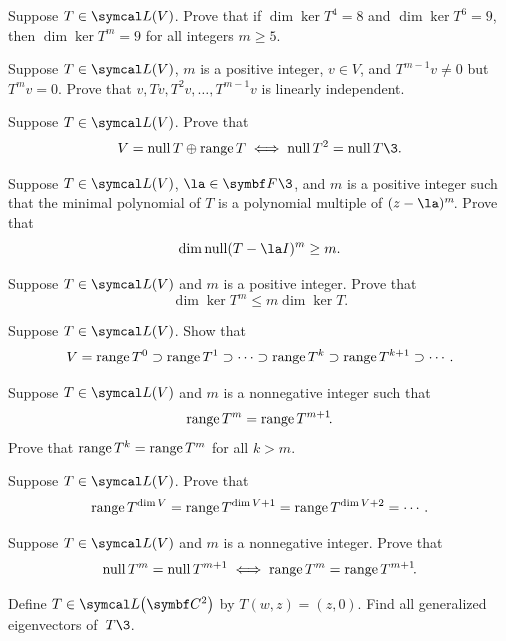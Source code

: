 \begin{exercises}

\exercise
Suppose $T \in \L(V)$. Prove that if $\dim \ker T^4 = 8$ and $\dim \ker T^6 = 9$, then $\dim \ker T^m = 9$ for all integers $m \ge 5$.


\exercise
Suppose $T \in \L(V)$, $m$ is a positive integer, $v \in V$, and $T^{m-1} v \ne 0$ but $T^m v = 0$. Prove that
$
v, Tv, T^2 v, \dots, T^{m-1} v
$
is linearly independent.\label{8linind}


\exercise
Suppose $T \in \L(V)$. Prove that
\[
V = \ker T \oplus \ran T \iff \ker T^2 = \ker T\3.
\]
\exercisedisplayend


\exercise
Suppose $T \in \L(V)$, $\la \in \F{}\3$, and $m$ is a positive integer such that the minimal polynomial of $T$ is a polynomial multiple of
$(z - \la)^m\!$. Prove that
\[
\dim \ker(T - \la I)^m \ge m.
\]
\exercisedisplayend


\exercise
Suppose $T \in \L(V)$ and $m$ is a positive integer. Prove that
\[
\dim \ker T^m \le m \dim \ker T.
\]
\exercisedisplayend
{}


\exercise
Suppose $T \in \L(V)$. Show that \label{range1}
\[
V = \operatorname{range} T^0 \supset \operatorname{range} T^1 \supset \cdots
\supset \operatorname{range} T^k \supset \operatorname{range} T^{k+1} \supset \dotsb .
\]
\exercisedisplayend


\exercise
Suppose $T \in \L(V)$ and $m$ is a nonnegative integer such that \label{range2}
\[
\operatorname{range} T^m = \operatorname{range} T^{m+1}\!.
\]
Prove that $\operatorname{range} T^k = \operatorname{range} T^m$ for all $k > m$.


\exercise
Suppose $T \in \L(V)$. Prove that\label{range3}
\[
\operatorname{range} T^{\dim V} = \operatorname{range} T^{\dim V + 1} = \operatorname{range} T^{\dim V + 2} = \dotsb .
\]
\exercisedisplayend


\exercise
Suppose $T \in \L(V)$ and $m$ is a nonnegative integer. Prove that\label{kerran}
\[
\operatorname{null} T^m = \operatorname{null} T^{m+1} \iff \operatorname{range} T^m = \operatorname{range} T^{m+1}\!.
\]
\exercisedisplayend

\exercise
Define $T \in \L\paren[\big]{\C{2}}$ by
$
T(w,z) = (z,0)$.
Find all generalized eigenvectors of~$T\3$.



\end{exercises}
